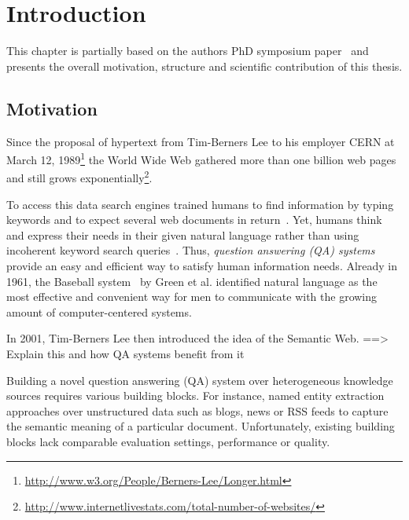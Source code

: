 \chapter{Introduction}
This chapter is partially based on the authors PhD symposium paper~\cite{combiningLDandIR} and presents the overall motivation, structure and scientific contribution of this thesis.

\section{Motivation}
Since the proposal of hypertext from Tim-Berners Lee to his employer CERN at March 12, 1989\footnote{\url{http://www.w3.org/People/Berners-Lee/Longer.html}} the World Wide Web gathered more than one billion web pages and still grows exponentially\footnote{\url{http://www.internetlivestats.com/total-number-of-websites/}}.

To access this data search engines trained humans to find information by typing keywords and to expect several web documents in return~\cite{ilprints361}.
Yet, humans think and express their needs in their given natural language rather than using incoherent keyword search queries~\cite{woods1973progress}. 
Thus, \emph{question answering (QA) systems} provide an easy and efficient way to satisfy human information needs. 
Already in 1961, the Baseball system~\cite{green1961baseball} by Green et al. identified natural language as the most effective and convenient way for men to communicate with the growing amount of computer-centered systems. 

In 2001, Tim-Berners Lee then introduced the idea of the Semantic Web. 
==> Explain this and how QA systems benefit from it


Building a novel question answering (QA) system over heterogeneous knowledge sources requires various building blocks.
For instance, named entity extraction approaches over unstructured data such as blogs, news or RSS feeds to capture the semantic meaning of a particular document.
Unfortunately, existing building blocks lack comparable evaluation settings, performance or quality. 

